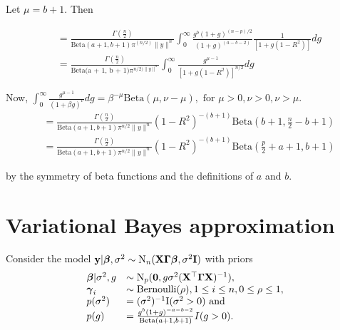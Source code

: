\documentclass{amsart}[12pt]
\begin{document}
Let $\mu = b + 1$. Then

\begin{equation*}
\begin{array}{ll}
&=\frac{\Gamma(\frac{n}{2})}{\text{Beta}(a + 1,  b + 1) \pi^(n/2) \| y \|^n}
\int_0^\infty \frac{g^b(1 + g)^{(n - p)/2}}{(1 + g)^{(a - b - 2)}} \frac{1}{[1 + g(1 - R^2)]} dg \\
&= \frac{\Gamma(\frac{n}{2})}{\text{Beta(a + 1, b + 1)} \pi^{n/2) \| y \|^n}}
\int_0^\infty \frac{g^{\mu - 1}}{[1 + g (1 - R^2)]^{n/2}} dg
\end{array}
\end{equation*}

Now, $\int_0^\infty \frac{g^{\mu - 1}}{(1 + \beta g)^\nu} dg = \beta^{-\mu} \text{Beta}(\mu, \nu - \mu), \text{ for } \mu > 0, \nu > 0, \nu > \mu$.
\begin{equation*}
\begin{array}{ll}
&= \frac{\Gamma(\frac{n}{2})}{\text{Beta}(a + 1, b + 1) \pi^{n / 2} \| y \|^n} (1 - R^2)^{-(b + 1)} \text{Beta}(b + 1, \frac{n}{2} - b + 1) \\
&= \frac{\Gamma(\frac{n}{2})}{\text{Beta}(a + 1, b + 1) \pi^{n / 2} \| y \|^n} (1 - R^2)^{-(b + 1)} \text{Beta}(\frac{p}{2} + a + 1, b + 1)
\end{array}
\end{equation*}

by the symmetry of beta functions and the definitions of $a$ and $b$.

\section{Variational Bayes approximation}

\def \I {\text{I}}

Consider the model ${\bf y} | {\boldsymbol \beta}, \sigma^2 \sim \text{N}_n({\bf X} {\boldsymbol \Gamma} {\boldsymbol \beta}, \sigma^2 {\bf I})$ with
priors
\begin{equation*}
\begin{array}{ll}
\vbeta | \sigma^2, g &\sim \text{N}_p(\vzero, g \sigma^2(\mX^\top \mGamma \mX)^{-1}), \\
\vgamma_i &\sim \text{Bernoulli}(\rho), 1 \leq i \leq n, 0 \leq \rho \leq 1, \\
p(\sigma^2) &= (\sigma^2)^{-1} \I(\sigma^2 > 0) \text{ and }\\
p(g) &= \frac{g^b (1 + g)^{-a - b - 2}}{\text{Beta}(a + 1, b + 1)} I(g > 0).
\end{array}
\end{equation*}
\end{document}
